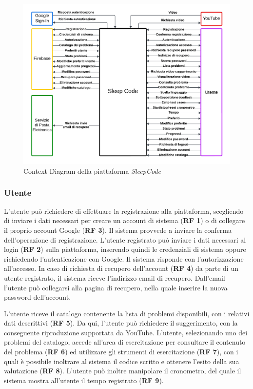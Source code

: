 \documentclass[11pt, a4paper]{article}
\theoremstyle{definition} %
\begin{document}
\begin{figure}[H]
\centering
\hspace*{-2.6cm}
\includegraphics[scale=0.7]{materiale/contextdiagram.pdf}
\caption{Context Diagram della piattaforma \textit{SleepCode}}
\label{contextdiagram}
\end{figure}

\subsubsection*{Utente}
L'utente può richiedere di effettuare la registrazione alla piattaforma,
scegliendo di inviare i dati necessari per creare un
account di sistema (\textbf{RF 1}) o di collegare il proprio account Google (\textbf{RF 3}). Il sistema
provvede a inviare la conferma dell'operazione di registrazione.
L'utente registrato può inviare i dati necessari al login (\textbf{RF 2}) sulla piattaforma,
inserendo quindi le credenziali di sistema oppure richiedendo l'autenticazione
con Google. Il sistema risponde con l'autorizzazione all'accesso.
In caso di richiesta di recupero dell'account (\textbf{RF 4}) da parte di un utente
registrato, il sistema riceve l'indirizzo email di recupero. Dall'email
l'utente può collegarsi alla pagina di recupero, nella quale inserire la
nuova password dell'account.

L'utente riceve il catalogo contenente la lista di problemi disponibili,
con i relativi dati descrittivi (\textbf{RF 5}). Da qui, l'utente può
richiedere il suggerimento, con la conseguente riproduzione supportata da
YouTube. L'utente, selezionando uno dei problemi del catalogo, accede
all'area di esercitazione per consultare il contenuto del problema (\textbf{RF 6})
ed utilizzare gli strumenti di esercitazione (\textbf{RF 7}), con i quali
è possibile inoltrare al sistema il codice scritto e ottenere l'esito della
sua valutazione (\textbf{RF 8}). L'utente può inoltre manipolare il cronometro,
del quale il sistema mostra all'utente il tempo registrato (\textbf{RF 9}).
\end{document}
